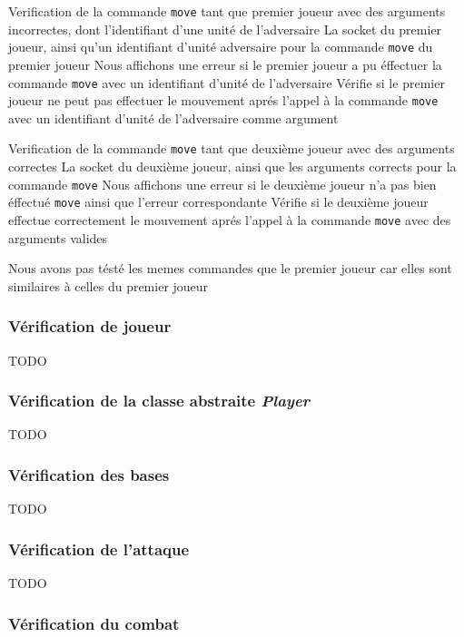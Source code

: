 \mytest
{Verification de la commande {\tt move} tant que premier joueur avec des arguments incorrectes, dont l'identifiant d'une unité de l'adversaire}
{La socket du premier joueur, ainsi qu'un identifiant d'unité adversaire pour la commande {\tt move} du premier joueur}
{Nous affichons une erreur si le premier joueur a pu éffectuer la commande {\tt move} avec un identifiant d'unité de l'adversaire}
{Vérifie si le premier joueur ne peut pas effectuer le mouvement aprés l'appel à la commande {\tt move} avec un identifiant d'unité de l'adversaire comme argument}

\mytest
{Verification de la commande {\tt move} tant que deuxième joueur avec des arguments correctes}
{La socket du deuxième joueur, ainsi que les arguments corrects pour la commande {\tt move}}
{Nous affichons une erreur si le deuxième joueur n'a pas bien éffectué {\tt move} ainsi que l'erreur correspondante}
{Vérifie si le deuxième joueur effectue correctement le mouvement aprés l'appel à la commande {\tt move} avec des arguments valides}

Nous avons pas tésté les memes commandes que le premier joueur car elles sont similaires à celles du premier joueur



\subsubsection{Vérification de joueur}

TODO

\subsubsection{Vérification de la classe abstraite \emph{Player}}

TODO

\subsubsection{Vérification des bases}

TODO

\subsubsection{Vérification de l'attaque}

TODO

\subsubsection{Vérification du combat}

